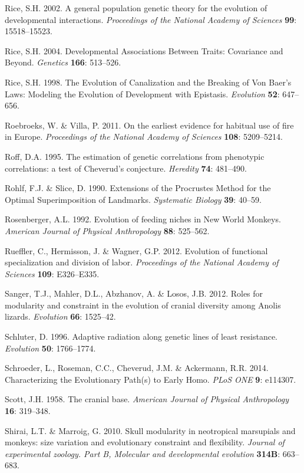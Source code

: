 \documentclass[12pt,twoside]{report}
\begin{document}
Rice, S.H. 2002. A general population genetic theory for the evolution
of developmental interactions. \emph{Proceedings of the National Academy
of Sciences} \textbf{99}: 15518--15523.

Rice, S.H. 2004. Developmental Associations Between Traits: Covariance
and Beyond. \emph{Genetics} \textbf{166}: 513--526.

Rice, S.H. 1998. The Evolution of Canalization and the Breaking of Von
Baer's Laws: Modeling the Evolution of Development with Epistasis.
\emph{Evolution} \textbf{52}: 647--656.

Roebroeks, W. \& Villa, P. 2011. On the earliest evidence for habitual
use of fire in Europe. \emph{Proceedings of the National Academy of
Sciences} \textbf{108}: 5209--5214.

Roff, D.A. 1995. The estimation of genetic correlations from phenotypic
correlations: a test of Cheverud's conjecture. \emph{Heredity}
\textbf{74}: 481--490.

Rohlf, F.J. \& Slice, D. 1990. Extensions of the Procrustes Method for
the Optimal Superimposition of Landmarks. \emph{Systematic Biology}
\textbf{39}: 40--59.

Rosenberger, A.L. 1992. Evolution of feeding niches in New World
Monkeys. \emph{American Journal of Physical Anthropology} \textbf{88}:
525--562.

Rueffler, C., Hermisson, J. \& Wagner, G.P. 2012. Evolution of
functional specialization and division of labor. \emph{Proceedings of
the National Academy of Sciences} \textbf{109}: E326--E335.

Sanger, T.J., Mahler, D.L., Abzhanov, A. \& Losos, J.B. 2012. Roles for
modularity and constraint in the evolution of cranial diversity among
Anolis lizards. \emph{Evolution} \textbf{66}: 1525--42.

Schluter, D. 1996. Adaptive radiation along genetic lines of least
resistance. \emph{Evolution} \textbf{50}: 1766--1774.

Schroeder, L., Roseman, C.C., Cheverud, J.M. \& Ackermann, R.R. 2014.
Characterizing the Evolutionary Path(s) to Early Homo. \emph{PLoS ONE}
\textbf{9}: e114307.

Scott, J.H. 1958. The cranial base. \emph{American Journal of Physical
Anthropology} \textbf{16}: 319--348.

Shirai, L.T. \& Marroig, G. 2010. Skull modularity in neotropical
marsupials and monkeys: size variation and evolutionary constraint and
flexibility. \emph{Journal of experimental zoology. Part B, Molecular
and developmental evolution} \textbf{314B}: 663--683.
\end{document}
